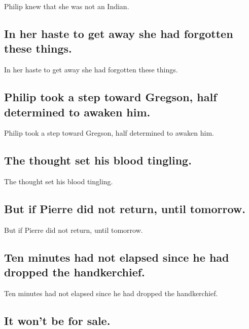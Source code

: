 \documentclass[]{article}
\begin{document}
Philip knew that she was not an Indian.

\hypertarget{in-her-haste-to-get-away-she-had-forgotten-these-things.}{%
\subsection{In her haste to get away she had forgotten these
things.}\label{in-her-haste-to-get-away-she-had-forgotten-these-things.}}

In her haste to get away she had forgotten these things.

\hypertarget{philip-took-a-step-toward-gregson-half-determined-to-awaken-him.}{%
\subsection{Philip took a step toward Gregson, half determined to awaken
him.}\label{philip-took-a-step-toward-gregson-half-determined-to-awaken-him.}}

Philip took a step toward Gregson, half determined to awaken him.

\hypertarget{the-thought-set-his-blood-tingling.}{%
\subsection{The thought set his blood
tingling.}\label{the-thought-set-his-blood-tingling.}}

The thought set his blood tingling.

\hypertarget{but-if-pierre-did-not-return-until-tomorrow.}{%
\subsection{But if Pierre did not return, until
tomorrow.}\label{but-if-pierre-did-not-return-until-tomorrow.}}

But if Pierre did not return, until tomorrow.

\hypertarget{ten-minutes-had-not-elapsed-since-he-had-dropped-the-handkerchief.}{%
\subsection{Ten minutes had not elapsed since he had dropped the
handkerchief.}\label{ten-minutes-had-not-elapsed-since-he-had-dropped-the-handkerchief.}}

Ten minutes had not elapsed since he had dropped the handkerchief.

\hypertarget{it-wont-be-for-sale.}{%
\subsection{It won't be for sale.}\label{it-wont-be-for-sale.}}
\end{document}
